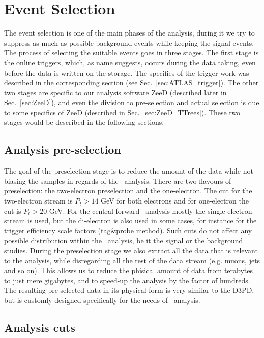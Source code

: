 \chapter{Event Selection}
\label{sec:Selection}

The event selection is one of the main phases of the analysis, during it we try to suppress as much as possible background events while keeping the signal events. The process of selecting the suitable events goes in three stages. The first stage is the online triggers, which, as name suggests, occurs during the data taking, even before the data is written on the storage. The specifies of the trigger work was described in the corresponding section (see Sec.~\ref{sec:ATLAS_trigger}). The other two stages are specific to our analysis software ZeeD (described later in Sec.~\ref{sec:ZeeD}), and even the division to pre-selection and actual selection is due to some specifics of ZeeD (described in Sec.~\ref{sec:ZeeD_TTrees}). These two stages would be described in the following sections.

\section{Analysis pre-selection}
\label{sec:Sel_pre-sel}

The goal of the preselection stage is to reduce the amount of the data while not biasing the samples in regards of the \Zee\ analysis. There are two flavours of preselection: the two-electron preselection and the one-electron. The cut for the two-electron stream is $P_{t} > 14$ GeV for both electrons and for one-electron the cut is $P_{t} > 20$ GeV. For the central-forward \Zee\ analysis mostly the single-electron stream is used, but the di-electron is also used in some cases, for instance for the trigger efficiency scale factors (tag\&probe method). Such cuts do not affect any possible distribution within the \Zee\ analysis, be it the signal or the background studies. During the preselection stage we also extract all the data that is relevant to the analysis, while disregarding all the rest of the data stream (e.g. muons, jets and so on). This allows us to reduce the phisical amount of data from terabytes to just mere gigabytes, and to speed-up the analysis by the factor of hundreds. The resulting pre-selected data in its physical form is very similar to the D3PD, but is customly designed specifically for the needs of \Zee\ analysis.

\section{Analysis cuts}
\label{sec:Sel_cuts}

